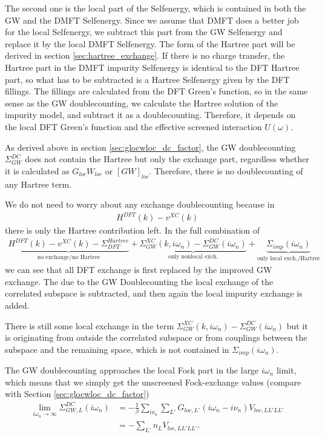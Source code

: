 \documentclass[12pt,a4paper]{scrartcl}
\numberwithin{equation}{section}
\begin{document}
The second one is the local part of the Selfenergy, which
is contained in both the GW and the DMFT Selfenergy. Since we assume that DMFT
does a better job for the local Selfenergy, we subtract this part from the
GW Selfenergy and replace it by the local DMFT Selfenergy. 
The form of the Hartree part will be derived in section \ref{sec:hartree_exchange}.
If there is no charge transfer, the
Hartree part in the DMFT impurity Selfenergy is identical to the 
DFT Hartree part, so what has to be subtracted is a Hartree Selfenergy
given by the DFT fillings.
The fillings are calculated from the DFT Green's function, so
in the same sense as the GW doublecounting, we calculate the Hartree solution
of the impurity model, and subtract it as a doublecounting.
Therefore, it depends on the local DFT Green's function 
and the effective screened interaction $U(\omega)$. 

As derived above in section \ref{sec:glocwloc_dc_factor},
the GW doublecounting $\Sigma_{GW}^{DC}$ does not contain the Hartree but only the exchange part,
regardless whether it is calculated as $G_{loc}W_{loc}$ or $[GW]_{loc}$.
Therefore, there is no doublecounting of any Hartree term.

\bigskip

We do not need to worry about any exchange doublecounting because in
\begin{align}
 H^{DFT}(k) - v^{XC}(k)
\end{align}
there is only the Hartree contribution left. In the full
combination of 
\begin{align}
 \underbrace{H^{DFT}(k) - v^{XC}(k) - \Sigma^{Hartree}_{DFT}}_{\mbox{no exchange/no Hartree}}
          + \underbrace{\Sigma^{XC}_{GW}(k,i\omega_n) - \Sigma_{GW}^{DC}(i\omega_n)}_{\mbox{only nonlocal exch.}}
          + \underbrace{\Sigma_{imp}(i\omega_n)}_{\mbox{only local exch./Hartree}}
\end{align}
we can see that all DFT exchange is first replaced by the improved GW exchange.
The due to the GW Doublecounting the local exchange of the correlated subspace
is subtracted, and then again the local impurity exchange is added.

There is still some local exchange in the term 
$\Sigma^{XC}_{GW}(k,i\omega_n) - \Sigma_{GW}^{DC}(i\omega_n)$ but it is originating
from outside the correlated subspace or from couplings between the subspace and the remaining
space, which is not contained in $\Sigma_{imp}(i\omega_n)$.

The GW doublecounting approaches the local Fock part in the large $i\omega_n$ limit,
which means that we simply get the unscreened Fock-exchange 
values (compare with Section \ref{sec:glocwloc_dc_factor})
\begin{align}
\lim_{i\omega_n\rightarrow \infty} \Sigma^{DC}_{GW,L}(i\omega_n) 
&= -\frac{1}{\beta} \sum_{i\nu_n}\sum_{L'} G_{loc,L'}(i\omega_n-i\nu_n)V_{loc,LL'LL'} \\
&= - \sum_{L'} n_LV_{loc,LL'LL'} .
\end{align}
\end{document}
